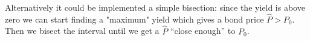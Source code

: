 %



Alternatively it could be implemented a simple bisection: since the yield is above zero we can start finding a "maximum" 
yield which gives a bond price $\hat{P}\gt P_0$. Then we bisect the interval until we get a $\hat{P}$ ``close enough''
to $P_0$.

